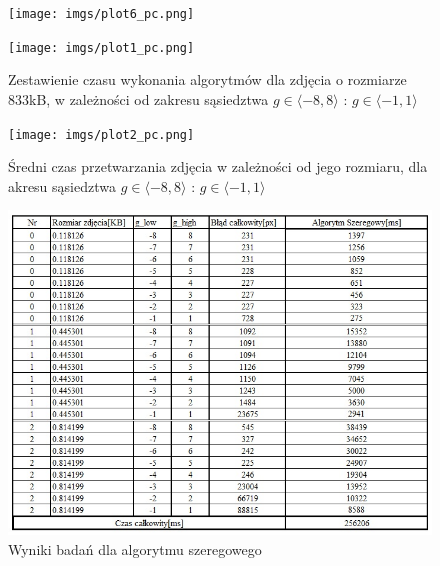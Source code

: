 \documentclass[document.tex]{subfiles}
\begin{document}
\begin{figure}[h]
\texttt{[image: imgs/plot6\_pc.png]}
\caption*{}
\label{fig:results_pc_hybrid}
\end{figure}

\begin{figure}[h]
\texttt{[image: imgs/plot1\_pc.png]}
\caption{Zestawienie czasu wykonania algorytmów dla zdjęcia o rozmiarze 833kB, 
        w zależności od zakresu sąsiedztwa $g\in \langle -8, 8 \rangle$ : $g\in \langle -1, 1 \rangle$ }
\label{fig:results_pc_hybrid}
\end{figure}

\begin{figure}[h]
\texttt{[image: imgs/plot2\_pc.png]}
\caption{Średni czas przetwarzania zdjęcia w zależności od jego rozmiaru, dla akresu sąsiedztwa $g\in \langle -8, 8 \rangle$ : $g\in \langle -1, 1 \rangle$}
\label{fig:results_pc_hybrid}
\end{figure}

\begin{figure}[h]
\includegraphics[scale=0.75]{imgs/results_lap_serial}
\caption{Wyniki badań dla algorytmu szeregowego}
\label{fig:results_lap_serial}
\end{figure}
\end{document}
